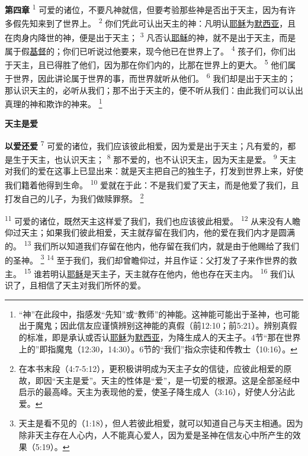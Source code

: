 \begin{multicols}{2}
\textbf{第四章\quad}
\textsuperscript{1}
可爱的诸位，不要凡神就信，但要考验那些神是否出于天主，因为有许多假先知来到了世界上。
\textsuperscript{2}
你们凭此可认出天主的神：凡明认\uline{耶稣}为\uline{默西亚}，且在肉身内降世的神，便是出于天主；
\textsuperscript{3}
凡否认\uline{耶稣}的神，就不是出于天主，而是属于假\uline{基督}的；你们已听说过他要来，现今他已在世界上了。
\textsuperscript{4}
孩子们，你们出于天主，且已得胜了他们，因为那在你们内的，比那在世界上的更大。
\textsuperscript{5}
他们属于世界，因此讲论属于世界的事，而世界就听从他们。
\textsuperscript{6}
我们却是出于天主的；那认识天主的，必听从我们；那不出于天主的，便不听从我们：由此我们可以认出真理的神和欺诈的神来。
\footnote{“神”在此段中，指感发“先知”或“教师”的神能。这神能可能出于圣神，也可能出于魔鬼；因此信友应谨慎辨别这神能的真假（前12:10；前5:21）。辨别真假的标准，即是承认或否认\uline{耶稣}为\uline{默西亚}，为降生成人的天主子。4节“那在世界上的”即指魔鬼（12:30，14:30）。6节的“我们”指众宗徒和传教士（10:16）。}

\begin{center}
	\textbf{\large{\songti 天主是爱}}
\end{center}

\textbf{以爱还爱\quad}
\textsuperscript{7}
可爱的诸位，我们应该彼此相爱，因为爱是出于天主；凡有爱的，都是生于天主，也认识天主；
\textsuperscript{8}
那不爱的，也不认识天主，因为天主是爱。
\textsuperscript{9}
天主对我们的爱在这事上已显出来：就是天主把自己的独生子，打发到世界上来，好使我们籍着他得到生命。
\textsuperscript{10}
爱就在于此：不是我们爱了天主，而是他爱了我们，且打发自己的儿子，为我们做赎罪祭。
\footnote{在本书末段（4:7-5:12），更积极讲明成为天主子女的信徒，应彼此相爱的原故，即因“天主是爱”。天主的性体是“爱”，是一切爱的根源。这是全部圣经中启示的最高峰。天主为表现他的爱，使圣子降生成人（3:16），好使人分沾此爱。}

\textsuperscript{11}
可爱的诸位，既然天主这样爱了我们，我们也应该彼此相爱。
\textsuperscript{12}
从来没有人瞻仰过天主；如果我们彼此相爱，天主就存留在我们内，他的爱在我们内才是圆满的。
\textsuperscript{13}
我们所以知道我们存留在他内，他存留在我们内，就是由于他赐给了我们的圣神。
\footnote{天主是看不见的（1:18），但人若彼此相爱，就可以知道自己与天主相通。因为除非天主存在人心内，人不能真心爱人，因为爱是圣神在信友心中所产生的效果（5:19）。}
\textsuperscript{14}
至于我们，我们却曾瞻仰过，并且作证：父打发了子来作世界的救主。
\textsuperscript{15}
谁若明认\uline{耶稣}是天主子，天主就存在他内，他也存在天主内。
\textsuperscript{16}
我们认识了，且相信了天主对我们所怀的爱。


\end{multicols}
